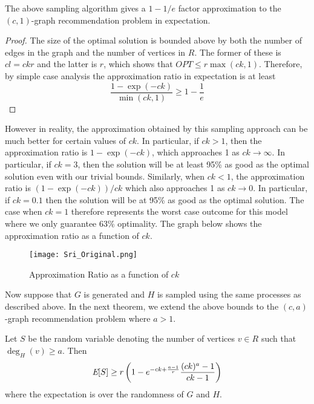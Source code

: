 \begin{thm}
The above sampling algorithm gives a $1-1/e$ factor approximation to the $(c,1)$-graph recommendation problem in expectation.
\end{thm}
\begin{proof}
The size of the optimal solution is bounded above by both the number
of edges in the graph and the number of vertices in $R$. The former of
these is $cl=ckr$ and the latter is $r$, which shows that $OPT \leq
r\max(ck,1)$. Therefore, by simple case analysis the approximation ratio
in expectation is at least
\[ \frac{1-\exp(-ck)}{\min(ck,1)} \geq 1-\frac{1}{e} \]
\end{proof}

However in reality, the approximation obtained by this sampling
approach can be much better for certain values of $ck$. In particular,
if $ck>1$, then the approximation ratio is $1-\exp(-ck)$, which
approaches 1 as $ck\to\infty$. In particular, if $ck=3$, then the
solution will be at least 95\% as good as the optimal solution even
with our trivial bounds. Similarly, when $ck<1$, the approximation
ratio is $(1-\exp(-ck))/ck$ which also approaches 1 as $ck\to 0$. In
particular, if $ck=0.1$ then the solution will be at 95\% as good as
the optimal solution. The case when $ck=1$ therefore represents the
worst case outcome for this model where we only guarantee 63\%
optimality. The graph below shows the approximation ratio as a
function of $ck$.\vs

\begin{figure}[h]
\centering
\texttt{[image: Sri\_Original.png]}
\caption{Approximation Ratio as a function of $ck$ }
\end{figure}

Now suppose that $G$ is generated and $H$ is sampled using the same
processes as described above. In the next theorem, we extend the above
bounds to the $(c,a)$-graph recommendation problem where $a>1$.

\begin{thm}
Let $S$ be the random variable denoting the number of vertices $v \in R$ such that $\deg_{H}(v)\geq a$. Then
\[ \emph{\text{E}}[S] \geq r\left(1-e^{-ck+\frac{a-1}{r}}\frac{(ck)^a-1}{ck-1}\right)  \]
where the expectation is over the randomness of $G$ and $H$.
\end{thm}

